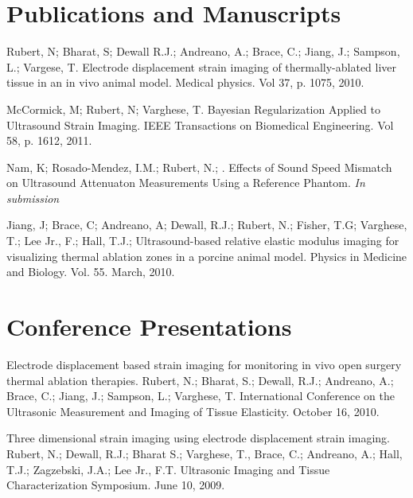 \documentclass[margin,line]{res}
\begin{document}
\begin{resume}
\section{\sc Publications and Manuscripts}

Rubert, N; Bharat, S; Dewall R.J.; Andreano, A.; Brace, C.; Jiang, J.; Sampson, L.; Vargese, T.  Electrode displacement strain imaging of thermally-ablated liver tissue in an in vivo animal model.  Medical physics. Vol 37, p. 1075, 2010.

McCormick, M; Rubert, N; Varghese, T. Bayesian Regularization Applied to
Ultrasound Strain Imaging. IEEE Transactions on Biomedical Engineering.
Vol 58, p. 1612, 2011.

Nam, K; Rosado-Mendez, I.M.; Rubert, N.; .  Effects of Sound Speed Mismatch on Ultrasound Attenuaton Measurements Using a Reference Phantom.  	{\it In submission}

Jiang, J; Brace, C; Andreano, A; Dewall, R.J.; Rubert, N.; Fisher, T.G; Varghese, T.; Lee Jr., F.; Hall, T.J.;  Ultrasound-based relative elastic modulus imaging for visualizing thermal ablation zones in a porcine animal model.  Physics in Medicine and Biology.  Vol. 55.  March, 2010.


\section{\sc Conference Presentations}

Electrode displacement based strain imaging for monitoring in vivo open surgery thermal ablation therapies.  Rubert, N.; Bharat, S.; Dewall, R.J.; Andreano, A.; Brace, C.; Jiang, J.; Sampson, L.; Varghese, T. International Conference on the Ultrasonic Measurement and Imaging of Tissue Elasticity.  October 16, 2010.

Three dimensional strain imaging using electrode displacement strain imaging. Rubert, N.; Dewall, R.J.; Bharat S.; Varghese, T., Brace, C.; Andreano, A.; Hall, T.J.; Zagzebski, J.A.; Lee Jr., F.T.  Ultrasonic Imaging and Tissue Characterization Symposium.  June 10, 2009.

\end{resume}
\end{document}
